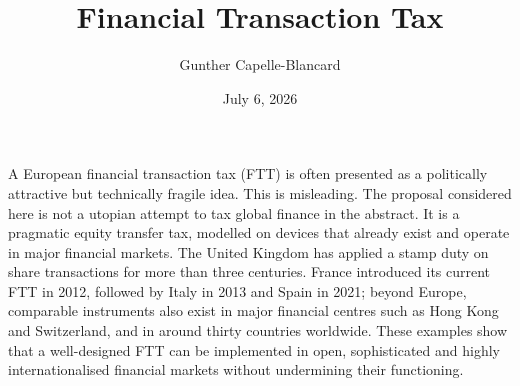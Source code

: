 \documentclass[../../main]{subfiles}
\begin{document}
\title{Financial Transaction Tax}
\author{Gunther Capelle-Blancard}
\date{July 6, 2026}
\maketitle


A European financial transaction tax (FTT) is often presented as a politically attractive but technically fragile idea. This is misleading. The proposal considered here is not a utopian attempt to tax global finance in the abstract. It is a pragmatic equity transfer tax, modelled on devices that already exist and operate in major financial markets. The United Kingdom has applied a stamp duty on share transactions for more than three centuries. France introduced its current FTT in 2012, followed by Italy in 2013 and Spain in 2021; beyond Europe, comparable instruments also exist in major financial centres such as Hong Kong and Switzerland, and in around thirty countries worldwide. These examples show that a well-designed FTT can be implemented in open, sophisticated and highly internationalised financial markets without undermining their functioning.



\end{document}
